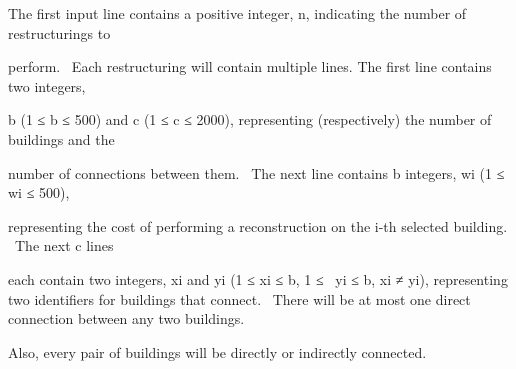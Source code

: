 The first input line contains a positive integer, n, indicating the number of restructurings to 

perform.  Each restructuring will contain multiple lines. The first line contains two integers,

b (1 ≤ b ≤ 500) and c (1 ≤ c ≤ 2000), representing (respectively) the number of buildings and the 

number of connections between them.  The next line contains b integers, wi (1 ≤ wi ≤ 500), 

representing the cost of performing a reconstruction on the i-th selected building.  The next c lines 

each contain two integers, xi and yi (1 ≤ xi ≤ b, 1 ≤  yi ≤ b, xi ≠ yi), representing two identifiers for buildings that connect.  There will be at most one direct connection between any two buildings.

Also, every pair of buildings will be directly or indirectly connected.